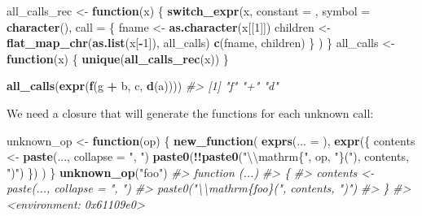 \documentclass[]{book}
\newenvironment{Shaded}{\begin{snugshade}}{\end{snugshade}}
\newcommand{\CharTok}[1]{\textcolor[rgb]{0.5,0.5,0.5}{#1}}
\newcommand{\CommentTok}[1]{\textcolor[rgb]{0.37,0.37,0.37}{\textit{#1}}}
\newcommand{\ControlFlowTok}[1]{\textcolor[rgb]{0.27,0.27,0.27}{\textbf{#1}}}
\newcommand{\DataTypeTok}[1]{\textcolor[rgb]{0.27,0.27,0.27}{#1}}
\newcommand{\DecValTok}[1]{\textcolor[rgb]{0.06,0.06,0.06}{#1}}
\newcommand{\KeywordTok}[1]{\textcolor[rgb]{0.27,0.27,0.27}{\textbf{#1}}}
\newcommand{\NormalTok}[1]{#1}
\newcommand{\OperatorTok}[1]{\textcolor[rgb]{0.43,0.43,0.43}{\textbf{#1}}}
\newcommand{\StringTok}[1]{\textcolor[rgb]{0.5,0.5,0.5}{#1}}
\begin{document}
\begin{Shaded}
\begin{Highlighting}[]
\NormalTok{all_calls_rec <-}\StringTok{ }\ControlFlowTok{function}\NormalTok{(x) \{}
  \KeywordTok{switch_expr}\NormalTok{(x,}
    \DataTypeTok{constant =}\NormalTok{ ,}
    \DataTypeTok{symbol =}   \KeywordTok{character}\NormalTok{(),}
    \DataTypeTok{call =}\NormalTok{ \{}
\NormalTok{      fname <-}\StringTok{ }\KeywordTok{as.character}\NormalTok{(x[[}\DecValTok{1}\NormalTok{]])}
\NormalTok{      children <-}\StringTok{ }\KeywordTok{flat_map_chr}\NormalTok{(}\KeywordTok{as.list}\NormalTok{(x[}\OperatorTok{-}\DecValTok{1}\NormalTok{]), all_calls)}
      \KeywordTok{c}\NormalTok{(fname, children)}
\NormalTok{    \}}
\NormalTok{  )}
\NormalTok{\}}
\NormalTok{all_calls <-}\StringTok{ }\ControlFlowTok{function}\NormalTok{(x) \{}
  \KeywordTok{unique}\NormalTok{(}\KeywordTok{all_calls_rec}\NormalTok{(x))}
\NormalTok{\}}

\KeywordTok{all_calls}\NormalTok{(}\KeywordTok{expr}\NormalTok{(}\KeywordTok{f}\NormalTok{(g }\OperatorTok{+}\StringTok{ }\NormalTok{b, c, }\KeywordTok{d}\NormalTok{(a))))}
\CommentTok{#> [1] "f" "+" "d"}
\end{Highlighting}
\end{Shaded}

We need a closure that will generate the functions for each unknown call:

\begin{Shaded}
\begin{Highlighting}[]
\NormalTok{unknown_op <-}\StringTok{ }\ControlFlowTok{function}\NormalTok{(op) \{}
  \KeywordTok{new_function}\NormalTok{(}
    \KeywordTok{exprs}\NormalTok{(}\DataTypeTok{... =}\NormalTok{ ),}
    \KeywordTok{expr}\NormalTok{(\{}
\NormalTok{      contents <-}\StringTok{ }\KeywordTok{paste}\NormalTok{(..., }\DataTypeTok{collapse =} \StringTok{", "}\NormalTok{)}
      \KeywordTok{paste0}\NormalTok{(}\OperatorTok{!!}\KeywordTok{paste0}\NormalTok{(}\StringTok{"}\CharTok{\textbackslash{}\textbackslash{}}\StringTok{mathrm\{"}\NormalTok{, op, }\StringTok{"\}("}\NormalTok{), contents, }\StringTok{")"}\NormalTok{)}
\NormalTok{    \})}
\NormalTok{  )}
\NormalTok{\}}
\KeywordTok{unknown_op}\NormalTok{(}\StringTok{"foo"}\NormalTok{)}
\CommentTok{#> function (...) }
\CommentTok{#> \{}
\CommentTok{#>     contents <- paste(..., collapse = ", ")}
\CommentTok{#>     paste0("\textbackslash{}\textbackslash{}mathrm\{foo\}(", contents, ")")}
\CommentTok{#> \}}
\CommentTok{#> <environment: 0x61109e0>}
\end{Highlighting}
\end{Shaded}
\end{document}
